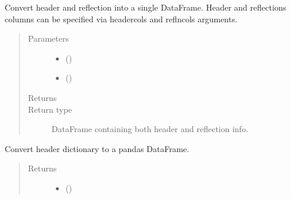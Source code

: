 \documentclass[letterpaper,10pt,english]{sphinxmanual}
\begin{document}
\begin{fulllineitems}
\begin{fulllineitems}
\label{\detokenize{usage/installation:xtalphases.data.preprocess.CIFParser.header_refln_df}}
Convert header and reflection into a single DataFrame. Header
and reflections columns can be specified via headercols and
reflncols arguments.
\begin{quote}\begin{description}
\item[{Parameters}] \leavevmode\begin{itemize}
\item {} 
 () \textendash{} 

\item {} 
 () \textendash{} 

\end{itemize}

\item[{Returns}] \leavevmode
{}

\item[{Return type}] \leavevmode
DataFrame containing both header and reflection info.

\end{description}\end{quote}

\end{fulllineitems}


\begin{fulllineitems}
\label{\detokenize{usage/installation:xtalphases.data.preprocess.CIFParser.header_to_df}}
Convert header dictionary to a pandas DataFrame.
\begin{quote}\begin{description}
\item[{Returns}] \leavevmode
\begin{itemize}
\item {} 
 ()


\end{itemize}
\end{description}
\end{quote}
\end{fulllineitems}
\end{fulllineitems}
\end{document}
